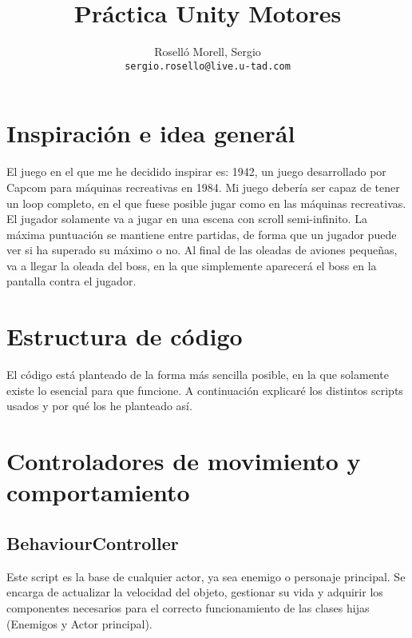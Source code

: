 \documentclass[titlepage, 4apaper]{article}
\title{Práctica Unity Motores}
\author{Roselló Morell, Sergio\\
\texttt{sergio.rosello@live.u-tad.com}}
\begin{document}
\maketitle
\tableofcontents
\clearpage

\section{Inspiración e idea generál}
El juego en el que me he decidido inspirar es: 1942, un juego desarrollado por Capcom para máquinas recreativas en 1984. Mi juego debería ser capaz de tener un loop completo, en el que fuese posible jugar como en las máquinas recreativas. El jugador solamente va a jugar en una escena con scroll semi-infinito. La máxima puntuación se mantiene entre partidas, de forma que un jugador puede ver si ha superado su máximo o no. Al final de las oleadas de aviones pequeñas, va a llegar la oleada del boss, en la que simplemente aparecerá el boss en la pantalla contra el jugador.
\section{Estructura de código}
El código está planteado de la forma más sencilla posible, en la que solamente existe lo esencial para que funcione. A continuación explicaré los distintos scripts usados y por qué los he planteado así.

\section{Controladores de movimiento y comportamiento}
\subsection{BehaviourController}
Este script es la base de cualquier actor, ya sea enemigo o personaje principal. Se encarga de actualizar la velocidad del objeto, gestionar su vida y adquirir los componentes necesarios para el correcto funcionamiento de las clases hijas (Enemigos y Actor principal).
\end{document}
